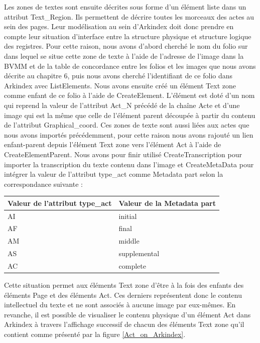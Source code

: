 \documentclass[a4paper,12pt,twoside]{book}
\begin{document}
	Les zones de textes sont ensuite décrites sous forme d'un élément liste dans un attribut \og Text\_Region\fg{}. Ils permettent de décrire toutes les morceaux des actes au sein des pages. Leur modélisation au sein d'Arkindex doit donc prendre en compte leur situation d'interface entre la structure physique et structure logique des registres. Pour cette raison, nous avons d'abord cherché le nom du folio sur dans lequel se situe cette zone de texte à l'aide de l'adresse de l'image dans la BVMM et de la table de concordance entre les folios et les images que nous avons décrite au chapitre 6, puis nous avons cherché l'identifiant de ce folio dans Arkindex avec ListElements. Nous avons ensuite créé un élément Text zone comme enfant de ce folio à l'aide de CreateElement. L'élément est doté d'un nom qui reprend la valeur de l'attribut \og Act\_N\fg{} précédé de la chaîne \og Acte\fg{} et d'une image qui est la même que celle de l'élément parent découpée à partir du contenu de l'attribut \og Graphical\_coord\fg{}. Ces zones de texte sont aussi liées aux actes que nous avons importés précédemment, pour cette raison nous avons rajouté un lien enfant-parent depuis l'élément Text zone vers l'élément Act à l'aide de CreateElementParent. Nous avons pour finir utilisé CreateTranscription pour importer la transcription du texte contenu dans l'image et CreateMetaData pour intégrer la valeur de l'attribut \og type\_act{} comme Metadata \og part\fg{} selon la correspondance suivante :
	
	\begin{center}
		\begin{tabular}{|p{4cm}|p{4cm}|}
			\hline
			Valeur de l'attribut \og type\_act\fg{} & Valeur de la Metadata \og part\fg{}\\
			\hline\hline
			AI & initial \\ \hline
			AF & final \\ \hline
			AM & middle \\ \hline
			AS & supplemental \\ \hline
			AC & complete \\ \hline
		\end{tabular}
	\end{center}
	
	Cette situation permet aux éléments \og Text zone\fg{} d'être à la fois des enfants des éléments \og Page\fg{} et des éléments \og Act\fg{}. Ces derniers représentent donc le contenu intellectuel du texte et ne sont associés à aucune image par eux-mêmes. En revanche, il est possible de visualiser le contenu physique d'un élément \og Act\fg{} dans Arkindex à travers l'affichage successif de chacun des éléments \og Text zone\fg{} qu'il contient comme présenté par la figure \ref{Act_on_Arkindex}.
	
\end{document}
